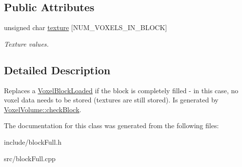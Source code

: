 \subsection*{\-Public \-Attributes}
\begin{DoxyCompactItemize}
\item 
\hypertarget{classVoxelBlockFull_a9b610b3b51483a1691e572572a4ded38}{
unsigned char \hyperlink{classVoxelBlockFull_a9b610b3b51483a1691e572572a4ded38}{texture} \mbox{[}\-N\-U\-M\-\_\-\-V\-O\-X\-E\-L\-S\-\_\-\-I\-N\-\_\-\-B\-L\-O\-C\-K\mbox{]}}
\label{db/d9c/classVoxelBlockFull_a9b610b3b51483a1691e572572a4ded38}

\begin{DoxyCompactList}\small\item\em \-Texture values. \end{DoxyCompactList}\end{DoxyCompactItemize}


\subsection{\-Detailed \-Description}
\-Replaces a \hyperlink{classVoxelBlockLoaded}{\-Voxel\-Block\-Loaded} if the block is completely filled -\/ in this case, no voxel data needs to be stored (textures are still stored). \-Is generated by \hyperlink{classVoxelVolume_a0a1e8cdc7c5c2ba73b08e3418579efce}{\-Voxel\-Volume\-::check\-Block}. 

\-The documentation for this class was generated from the following files\-:\begin{DoxyCompactItemize}
\item 
include/block\-Full.\-h\item 
src/block\-Full.\-cpp\end{DoxyCompactItemize}
